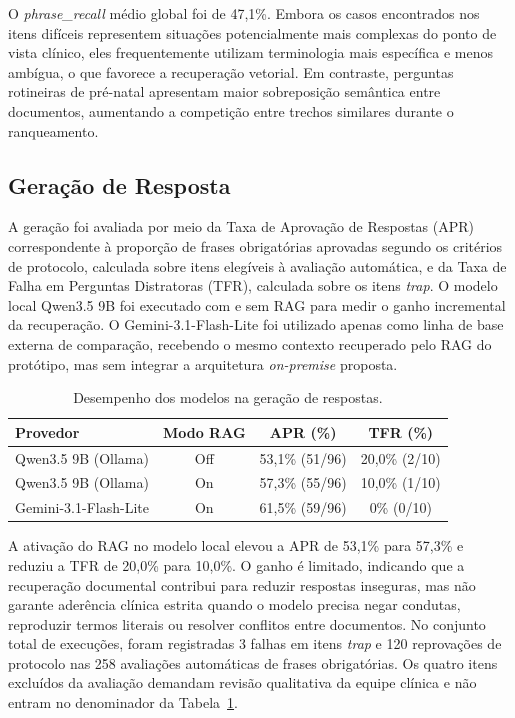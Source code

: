 \documentclass[12pt]{article}
\begin{document}
O \textit{phrase\_recall} médio global foi de 47,1\%.
Embora os casos encontrados nos itens difíceis representem situações potencialmente mais complexas do ponto de vista clínico, eles frequentemente utilizam terminologia mais específica e menos ambígua, o que favorece a recuperação vetorial.
Em contraste, perguntas rotineiras de pré-natal apresentam maior sobreposição semântica entre documentos, aumentando a competição entre trechos similares durante o ranqueamento.


\subsection{Geração de Resposta}

A geração foi avaliada por meio da Taxa de Aprovação de Respostas (APR) correspondente à proporção de frases obrigatórias aprovadas segundo os critérios de protocolo, calculada sobre itens elegíveis à avaliação automática, e da Taxa de Falha em Perguntas Distratoras (TFR), calculada sobre os itens \textit{trap}.
O modelo local Qwen3.5 9B foi executado com e sem RAG para medir o ganho incremental da recuperação.
O Gemini-3.1-Flash-Lite foi utilizado apenas como linha de base externa de comparação, recebendo o mesmo contexto recuperado pelo RAG do protótipo, mas sem integrar a arquitetura \textit{on-premise} proposta.

\begin{table}[H]
  \centering
  \caption{Desempenho dos modelos na geração de respostas.}
  \label{tab:apr_tfr_providers}
  \small
  \begin{tabular}{lccc}
  	\toprule
  	\textbf{Provedor}           & \textbf{Modo RAG} & \textbf{APR (\%)} & \textbf{TFR (\%)} \\
  	\midrule
  	Qwen3.5 9B (Ollama)         & Off               & 53,1\% (51/96)    & 20,0\% (2/10)     \\
	  Qwen3.5 9B (Ollama)         & On                & 57,3\% (55/96)    & 10,0\% (1/10)     \\
  	Gemini-3.1-Flash-Lite       & On                & 61,5\% (59/96)    & 0\% (0/10)      \\
  	\bottomrule
  \end{tabular}
  \end{table}

A ativação do RAG no modelo local elevou a APR de 53,1\% para 57,3\% e reduziu a TFR de 20,0\% para 10,0\%.
O ganho é limitado, indicando que a recuperação documental contribui para reduzir respostas inseguras, mas não garante aderência clínica estrita quando o modelo precisa negar condutas, reproduzir termos literais ou resolver conflitos entre documentos.
No conjunto total de execuções, foram registradas 3 falhas em itens \textit{trap} e 120 reprovações de protocolo nas 258 avaliações automáticas de frases obrigatórias.
Os quatro itens excluídos da avaliação demandam revisão qualitativa da equipe clínica e não entram no denominador da Tabela~\ref{tab:apr_tfr_providers}.
\end{document}
